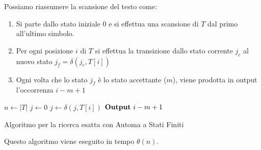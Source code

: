 Possiamo riassumere la scansione del testo come:
\begin{enumerate}
    \item Si parte dallo stato iniziale $0$ e si effettua una scansione di $T$ dal primo all'ultimo simbolo.
    \item Per ogni posizione $i$ di $T$ si effettua la transizione dallo stato corrente $j_c$ al nuovo stato $j_f = \delta(j_c, T[i])$
    \item Ogni volta che lo stato $j_f$ è lo stato accettante ($m$), viene prodotta in output l'occorrenza $i - m + 1$
\end{enumerate}
\begin{algorithm}
  \begin{algorithmic}
    \State $n \gets |T|$
    \State $j \gets 0$
        \State $j \gets \delta(j, T[i])$
            \State $\text{\textbf{Output}} \ i - m + 1$ 
        \EndIf
    \EndFor
    \EndFunction
  \end{algorithmic}
  \caption{Algoritmo per la ricerca esatta con Automa a Stati Finiti}
\end{algorithm}
Questo algoritmo viene eseguito in tempo $\theta(n)$.
